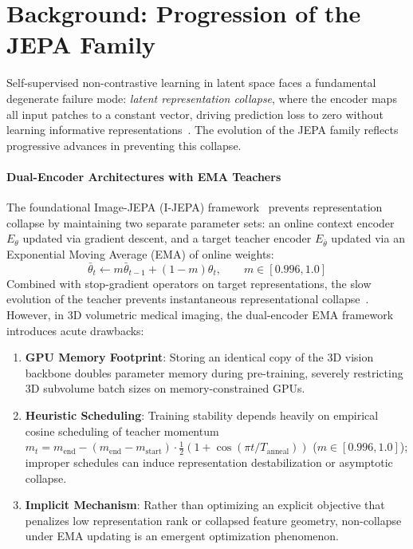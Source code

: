 \documentclass{article}
\begin{document}
\clearpage
\section{Background: Progression of the JEPA Family}
\label{sec:background}

Self-supervised non-contrastive learning in latent space faces a fundamental degenerate failure mode: \emph{latent representation collapse}, where the encoder maps all input patches to a constant vector, driving prediction loss to zero without learning informative representations~\citep{bardes2021vicreg,zbontar2021barlow}. The evolution of the JEPA family reflects progressive advances in preventing this collapse.

\paragraph{Dual-Encoder Architectures with EMA Teachers}
The foundational Image-JEPA (I-JEPA) framework~\citep{assran2023ijepa} prevents representation collapse by maintaining two separate parameter sets: an online context encoder $E_\theta$ updated via gradient descent, and a target teacher encoder $E_{\bar{\theta}}$ updated via an Exponential Moving Average (EMA) of online weights:
\begin{equation}
    \bar{\theta}_t \leftarrow m \bar{\theta}_{t-1} + (1 - m) \theta_t, \qquad m \in [0.996, 1.0]
\end{equation}
Combined with stop-gradient operators on target representations, the slow evolution of the teacher prevents instantaneous representational collapse~\citep{grill2020bootstrap}. However, in 3D volumetric medical imaging, the dual-encoder EMA framework introduces acute drawbacks:
\begin{enumerate}
    \item \textbf{GPU Memory Footprint}: Storing an identical copy of the 3D vision backbone doubles parameter memory during pre-training, severely restricting 3D subvolume batch sizes on memory-constrained GPUs.
    \item \textbf{Heuristic Scheduling}: Training stability depends heavily on empirical cosine scheduling of teacher momentum $m_t = m_{\text{end}} - (m_{\text{end}} - m_{\text{start}}) \cdot \frac{1}{2}(1 + \cos(\pi t / T_{\text{anneal}}))$ ($m \in [0.996, 1.0]$); improper schedules can induce representation destabilization or asymptotic collapse.
    \item \textbf{Implicit Mechanism}: Rather than optimizing an explicit objective that penalizes low representation rank or collapsed feature geometry, non-collapse under EMA updating is an emergent optimization phenomenon.
\end{enumerate}
\end{document}
